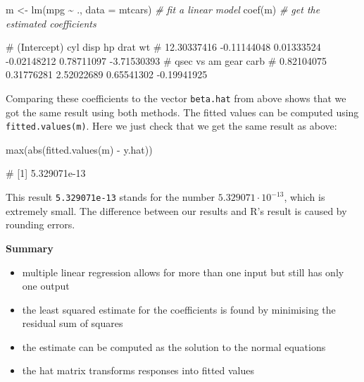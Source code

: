 \documentclass[
  a4paper,
]{article}
\newenvironment{Shaded}{\begin{snugshade}}{\end{snugshade}}
\newcommand{\AttributeTok}[1]{\textcolor[rgb]{0.77,0.63,0.00}{#1}}
\newcommand{\CommentTok}[1]{\textcolor[rgb]{0.56,0.35,0.01}{\textit{#1}}}
\newcommand{\FunctionTok}[1]{\textcolor[rgb]{0.00,0.00,0.00}{#1}}
\newcommand{\NormalTok}[1]{#1}
\newcommand{\OtherTok}[1]{\textcolor[rgb]{0.56,0.35,0.01}{#1}}
\newcommand{\SpecialCharTok}[1]{\textcolor[rgb]{0.00,0.00,0.00}{#1}}
\providecommand{\tightlist}{%
  \setlength{\itemsep}{0pt}\setlength{\parskip}{0pt}}
\theoremstyle{definition}
\theoremstyle{definition}
\theoremstyle{definition}
\theoremstyle{definition}
\theoremstyle{remark}
\begin{document}
\begin{Shaded}
\begin{Highlighting}[]
\NormalTok{m }\OtherTok{\textless{}{-}} \FunctionTok{lm}\NormalTok{(mpg }\SpecialCharTok{\textasciitilde{}}\NormalTok{ ., }\AttributeTok{data =}\NormalTok{ mtcars) }\CommentTok{\# fit a linear model}
\FunctionTok{coef}\NormalTok{(m) }\CommentTok{\# get the estimated coefficients}
\end{Highlighting}
\end{Shaded}

\begin{Shaded}
\begin{Highlighting}[]
\NormalTok{\# (Intercept)         cyl        disp          hp        drat          wt }
\NormalTok{\# 12.30337416 {-}0.11144048  0.01333524 {-}0.02148212  0.78711097 {-}3.71530393 }
\NormalTok{\#        qsec          vs          am        gear        carb }
\NormalTok{\#  0.82104075  0.31776281  2.52022689  0.65541302 {-}0.19941925}
\end{Highlighting}
\end{Shaded}

Comparing these coefficients to the vector \texttt{beta.hat} from above shows
that we got the same result using both methods. The fitted values
can be computed using \texttt{fitted.values(m)}. Here we just check that we get
the same result as above:

\begin{Shaded}
\begin{Highlighting}[]
\FunctionTok{max}\NormalTok{(}\FunctionTok{abs}\NormalTok{(}\FunctionTok{fitted.values}\NormalTok{(m) }\SpecialCharTok{{-}}\NormalTok{ y.hat))}
\end{Highlighting}
\end{Shaded}

\begin{Shaded}
\begin{Highlighting}[]
\NormalTok{\# [1] 5.329071e{-}13}
\end{Highlighting}
\end{Shaded}

This result \texttt{5.329071e-13} stands for the number \(5.329071 \cdot 10^{-13}\),
which is extremely small. The difference between our results and R's result
is caused by rounding errors.

\textbf{Summary}

\begin{itemize}
\tightlist
\item
  multiple linear regression allows for more than one input
  but still has only one output
\item
  the least squared estimate for the coefficients is found
  by minimising the residual sum of squares
\item
  the estimate can be computed as the solution to the normal equations
\item
  the hat matrix transforms responses into fitted values
\end{itemize}
\end{document}
